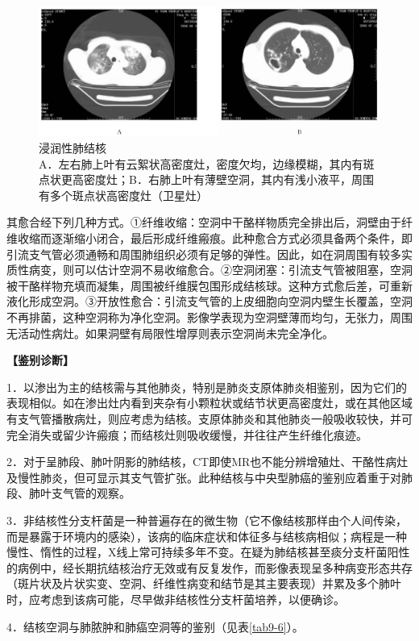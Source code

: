 \begin{figure}[!htbp]
 \centering
 \includegraphics[width=.7\textwidth,height=\textheight,keepaspectratio]{./images/Image00210.jpg}
 \captionsetup{justification=centering}
 \caption{浸润性肺结核\\{\small A．左右肺上叶有云絮状高密度灶，密度欠均，边缘模糊，其内有斑点状更高密度灶；B．右肺上叶有薄壁空洞，其内有浅小液平，周围有多个斑点状高密度灶（卫星灶）}}
 \label{fig9-23}
  \end{figure} 

其愈合经下列几种方式。①纤维收缩：空洞中干酪样物质完全排出后，洞壁由于纤维收缩而逐渐缩小闭合，最后形成纤维瘢痕。此种愈合方式必须具备两个条件，即引流支气管必须通畅和周围肺组织必须有足够的弹性。因此，如在洞周围有较多实质性病变，则可以估计空洞不易收缩愈合。②空洞闭塞：引流支气管被阻塞，空洞被干酪样物充填而凝集，周围被纤维膜包围形成结核球。这种方式愈后差，可重新液化形成空洞。③开放性愈合：引流支气管的上皮细胞向空洞内壁生长覆盖，空洞不再排菌，这种空洞称为净化空洞。影像学表现为空洞壁薄而均匀，无张力，周围无活动性病灶。如果洞壁有局限性增厚则表示空洞尚未完全净化。

\textbf{【鉴别诊断】}

1．以渗出为主的结核需与其他肺炎，特别是肺炎支原体肺炎相鉴别，因为它们的表现相似。如在渗出灶内看到夹杂有小颗粒状或结节状更高密度灶，或在其他区域有支气管播散病灶，则应考虑为结核。支原体肺炎和其他肺炎一般吸收较快，并可完全消失或留少许瘢痕；而结核灶则吸收缓慢，并往往产生纤维化痕迹。

2．对于呈肺段、肺叶阴影的肺结核，CT即使MR也不能分辨增殖灶、干酪性病灶及慢性肺炎，但可显示其支气管扩张。此种结核与中央型肺癌的鉴别应着重于对肺段、肺叶支气管的观察。

3．非结核性分支杆菌是一种普遍存在的微生物（它不像结核那样由个人间传染，而是暴露于环境内的感染），该病的临床症状和体征多与结核病相似；病程是一种慢性、惰性的过程，X线上常可持续多年不变。在疑为肺结核甚至痰分支杆菌阳性的病例中，经长期抗结核治疗无效或有反复发作，而影像表现呈多种病变形态共存（斑片状及片状实变、空洞、纤维性病变和结节是其主要表现）并累及多个肺叶时，应考虑到该病可能，尽早做非结核性分支杆菌培养，以便确诊。

4．结核空洞与肺脓肿和肺癌空洞等的鉴别（见表\ref{tab9-6}）。

